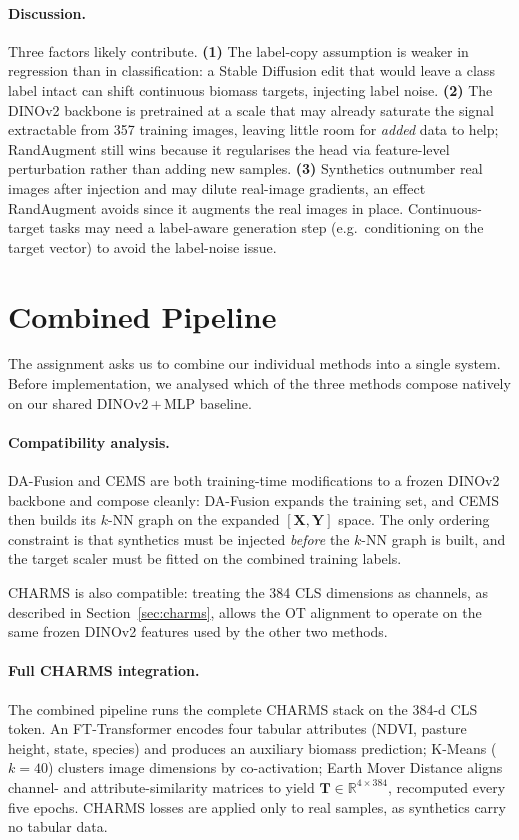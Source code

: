\documentclass[10pt, a4paper]{article}
\begin{document}
\paragraph{Discussion.}
Three factors likely contribute.
\textbf{(1)} The label-copy assumption is weaker in regression than in
classification: a Stable Diffusion edit that would leave a class label intact
can shift continuous biomass targets, injecting label noise.
\textbf{(2)} The DINOv2 backbone is pretrained at a scale that may already
saturate the signal extractable from 357 training images, leaving little room
for \emph{added} data to help; RandAugment still wins because it regularises
the head via feature-level perturbation rather than adding new samples.
\textbf{(3)} Synthetics outnumber real images after injection and may dilute
real-image gradients, an effect RandAugment avoids since it augments the real
images in place.
Continuous-target tasks may need a label-aware generation step (e.g.\
conditioning on the target vector) to avoid the label-noise issue.


\section{Combined Pipeline}
\label{sec:combined}

The assignment asks us to combine our individual methods into a single system.
Before implementation, we analysed which of the three methods compose natively
on our shared DINOv2\,+\,MLP baseline.

\paragraph{Compatibility analysis.}
DA-Fusion and CEMS are both training-time modifications to a frozen DINOv2
backbone and compose cleanly: DA-Fusion expands the training set, and CEMS
then builds its $k$-NN graph on the expanded $[\mathbf{X}, \mathbf{Y}]$ space.
The only ordering constraint is that synthetics must be injected \emph{before}
the $k$-NN graph is built, and the target scaler must be fitted on the
combined training labels.

CHARMS is also compatible: treating the 384 CLS dimensions as channels,
as described in Section~\ref{sec:charms}, allows the OT alignment to operate
on the same frozen DINOv2 features used by the other two methods.

\paragraph{Full CHARMS integration.}
The combined pipeline runs the complete CHARMS stack on the 384-d CLS token.
An FT-Transformer encodes four tabular attributes (NDVI, pasture height,
state, species) and produces an auxiliary biomass prediction; K-Means
($k{=}40$) clusters image dimensions by co-activation; Earth Mover Distance
aligns channel- and attribute-similarity matrices to yield
$\mathbf{T}\!\in\!\mathbb{R}^{4\times 384}$, recomputed every five epochs.
CHARMS losses are applied only to real samples, as synthetics carry no
tabular data.
\end{document}
